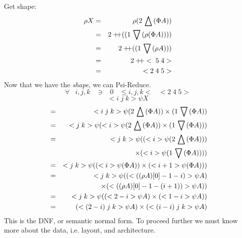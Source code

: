 Get shape: 
\begin{eqnarray}
\rho X & = & \rho (2 \take (\Phi A)) \nonumber \\
& = & 2 \cat ((1\drop (\rho ( \Phi A)))) \nonumber \\
&=& 2 \cat ((1 \drop (\rho  A))) \nonumber \\
&=& 2 \cat <\;5\;4> \nonumber \\
&=& <2\;4\;5>
\end{eqnarray}
Now that we have the {\em shape}, we can {Psi-Reduce}.
\[ \forall \;\;\; i,j,k \;\;\; \ni \;\;\; 0 \;\;\;\leq i,j,k < \;\;\;<2\;4\;5> \]
\[<i\;j\;k> \psi X \]
\begin{eqnarray}
& =&<i\;j\;k> \psi (2 \,\bigtriangleup\, ( \Phi A)) \times ( 1 \,\bigtriangledown\, (\Phi A)) \nonumber \\
&=&<j\;k> \psi (<i> \psi (2 \,\bigtriangleup\, ( \Phi A)) \times ( 1 \,\bigtriangledown\, (\Phi A)) )\nonumber \\
&= &<j\;k> \psi ((<i> \psi ( 2 \,\bigtriangleup\, (\Phi A))) \nonumber \\
&&\;\;\;\;\;\times ( <i> \psi ( 1 \,\bigtriangledown\, (\Phi A)))) \nonumber \\
&= &<j\;k> \psi (( <i> \psi (\Phi A)) \times (<i+1> \psi (\Phi A))) \nonumber \\
&=&<j\;k> \psi ((<((\rho A)[0] - 1 - i)> \psi A ) \nonumber \\
&& \;\;\;\;\;\times  (<((\rho A)[0] - 1 -( i + 1))> \psi A ) )\nonumber \\
&=&<j\;k> \psi ((< 2-i> \psi A ) \times (<1-i>  \psi A) ) \nonumber \\
&=& (< (2-i)\; j\;k> \psi A )  \times (<(i-i) \; j\;k> \psi A ) 
 \end{eqnarray}
\normalsize
This is the DNF, or semantic normal form. To proceed further we must know more about the data, i.e. layout, and architecture. 
